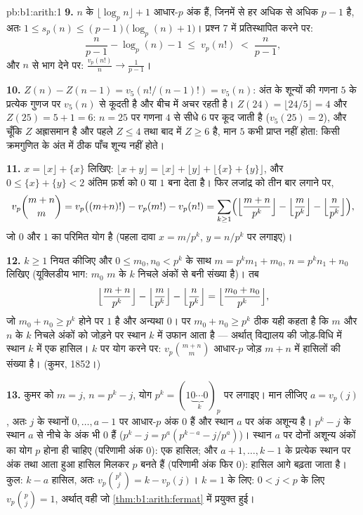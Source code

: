 \begin{solution}{pb:b1:arith:1}
\textbf{9.} $n$ के $\lfloor \log_p n \rfloor + 1$ आधार-$p$ अंक हैं, जिनमें
से हर अधिक से अधिक $p - 1$ है, अतः $1 \leq s_p(n) \leq (p-1)\bigl(\log_p(n)
+ 1\bigr)$। प्रश्न 7 में प्रतिस्थापित करने पर:
\[
\frac n{p-1} - \log_p(n) - 1 \;\leq\; v_p(n!) \;<\; \frac n{p-1},
\]
और $n$ से भाग देने पर: $\frac{v_p(n!)}n \to \frac1{p-1}$।

\textbf{10.} $Z(n) - Z(n-1) = v_5(n!/(n-1)!) = v_5(n)$: अंत के शून्यों की
गणना $5$ के प्रत्येक गुणज पर $v_5(n)$ से कूदती है और बीच में अचर रहती है।
$Z(24) = \lfloor24/5\rfloor = 4$ और $Z(25) = 5 + 1 = 6$: $n = 25$ पर गणना
$4$ से सीधे $6$ पर कूद जाती है ($v_5(25) = 2$), और चूँकि $Z$ अह्रासमान है और
पहले $Z \leq 4$ तथा बाद में $Z \geq 6$ है, मान $5$ कभी प्राप्त नहीं होता:
किसी क्रमगुणित के अंत में ठीक पाँच शून्य नहीं होते।

\textbf{11.} $x = \lfloor x\rfloor + \{x\}$ लिखिए: $\lfloor x + y\rfloor =
\lfloor x\rfloor + \lfloor y\rfloor + \lfloor \{x\} + \{y\}\rfloor$, और $0
\leq \{x\} + \{y\} < 2$ अंतिम फ़र्श को $0$ या $1$ बना देता है। फिर लजांद्र
को तीन बार लगाने पर,
\[
v_p\binom{m+n}m = v_p\bigl((m{+}n)!\bigr) - v_p(m!) - v_p(n!)
= \sum_{k\geq1}\Bigl(
\Bigl\lfloor\frac{m+n}{p^k}\Bigr\rfloor
- \Bigl\lfloor\frac{m}{p^k}\Bigr\rfloor
- \Bigl\lfloor\frac{n}{p^k}\Bigr\rfloor\Bigr),
\]
जो $0$ और $1$ का परिमित योग है (पहला दावा $x = m/p^k$, $y = n/p^k$ पर
लगाइए)।

\textbf{12.} $k \geq 1$ नियत कीजिए और $0 \leq m_0, n_0 < p^k$ के साथ $m =
p^km_1 + m_0$, $n = p^kn_1 + n_0$ लिखिए (यूक्लिडीय भाग: $m_0$ $m$ के $k$
निचले अंकों से बनी संख्या है)। तब
\[
\Bigl\lfloor\frac{m+n}{p^k}\Bigr\rfloor
- \Bigl\lfloor\frac m{p^k}\Bigr\rfloor
- \Bigl\lfloor\frac n{p^k}\Bigr\rfloor
= \Bigl\lfloor\frac{m_0 + n_0}{p^k}\Bigr\rfloor ,
\]
जो $m_0 + n_0 \geq p^k$ होने पर $1$ है और अन्यथा $0$। पर $m_0 + n_0 \geq
p^k$ ठीक यही कहता है कि $m$ और $n$ के $k$ निचले अंकों को जोड़ने पर स्थान $k$
में उफान आता है --- अर्थात् विद्यालय की जोड़-विधि में स्थान $k$ में एक
हासिल। $k$ पर योग करने पर: $v_p\binom{m+n}m$ आधार-$p$ जोड़ $m + n$ में
हासिलों की संख्या है। (कुमर, 1852।)

\textbf{13.} कुमर को $m = j$, $n = p^k - j$, योग $p^k =
(1\underbrace{0\cdots0}_{k})_p$ पर लगाइए। मान लीजिए $a = v_p(j)$, अतः $j$ के
स्थानों $0, \dots, a-1$ पर आधार-$p$ अंक $0$ हैं और स्थान $a$ पर अंक अशून्य
है। $p^k - j$ के स्थान $a$ से नीचे के अंक भी $0$ हैं ($p^k - j = p^a(p^{k-a}
- j/p^a)$)। स्थान $a$ पर दोनों अशून्य अंकों का योग $p$ होना ही चाहिए
(परिणामी अंक $0$): एक हासिल; और $a+1, \dots, k-1$ के प्रत्येक स्थान पर अंक
तथा आता हुआ हासिल मिलकर $p$ बनते हैं (परिणामी अंक फिर $0$): हासिल आगे बढ़ता
जाता है। कुल: $k - a$ हासिल, अतः $v_p\binom{p^k}j = k - v_p(j)$। $k = 1$ के
लिए: $0 < j < p$ के लिए $v_p\binom pj = 1$, अर्थात् वही  जो
\cref{thm:b1:arith:fermat} में प्रयुक्त हुई।


\end{solution}
